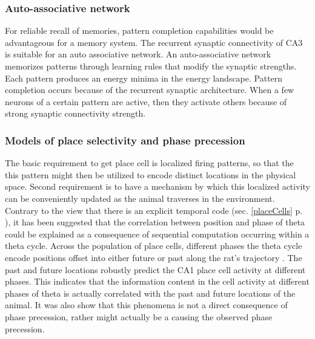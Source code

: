 \subsubsection{Auto-associative network}
For reliable recall of memories, pattern completion capabilities would be advantageous for a memory system. The recurrent synaptic connectivity of CA3 is suitable for an auto associative network.
An auto-associative network memorizes patterns through learning rules that modify the synaptic strengths. Each pattern produces an energy minima in the energy landscape. Pattern completion occurs because of the recurrent synaptic architecture. When a few neurons of a certain pattern are active, then they activate others because of strong synaptic connectivity strength. 


\subsubsection{Models of place selectivity and phase precession}
The basic requirement to get place cell is localized firing patterns, so that the this pattern might then be utilized to encode distinct locations in the physical space. Second requirement is to have a mechanism by which this localized activity can be conveniently updated as the animal traverses in the environment.\\

Contrary to the view that there is an explicit temporal code (sec. \ref{placeCells} p. \pageref{placeCells}), it has been suggested that the correlation between position and phase of theta could be explained as a consequence of sequential computation occurring within a theta cycle. Across the population of place cells, different phases the theta cycle encode positions offset into either future or past along the rat's trajectory \cite{Itskov2008}. The past and future locations  robustly predict the CA1 place cell activity at different phases. This indicates that the information content in the cell activity at different phases of theta is actually correlated with the past and future locations of the animal. It was also show that this phenomena is not a direct consequence of phase precession, rather might actually be a causing the observed phase precession. \\

